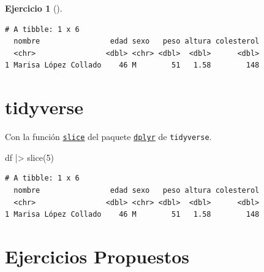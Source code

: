 \documentclass[
  spanish,
  a4paper,
]{scrreport}
\newenvironment{Shaded}{\begin{snugshade}}{\end{snugshade}}
\newcommand{\DecValTok}[1]{\textcolor[rgb]{0.68,0.00,0.00}{#1}}
\newcommand{\FunctionTok}[1]{\textcolor[rgb]{0.28,0.35,0.67}{#1}}
\newcommand{\NormalTok}[1]{\textcolor[rgb]{0.00,0.23,0.31}{#1}}
\newcommand{\SpecialCharTok}[1]{\textcolor[rgb]{0.37,0.37,0.37}{#1}}
\theoremstyle{definition}
\newtheorem{exercise}{Ejercicio}[chapter]
\theoremstyle{remark}
\begin{document}
\begin{exercise}[]
\begin{enumerate}
\begin{tcolorbox}
\begin{verbatim}
# A tibble: 1 x 6
  nombre                edad sexo   peso altura colesterol
  <chr>                <dbl> <chr> <dbl>  <dbl>      <dbl>
1 Marisa López Collado    46 M        51   1.58        148
\end{verbatim}

  \section{tidyverse}

  Con la función
  \href{https://dplyr.tidyverse.org/reference/slice.html}{\texttt{slice}}
  del paquete
  \href{https://dplyr.tidyverse.org/index.html}{\texttt{dplyr}} de
  \texttt{tidyverse}.

\begin{Shaded}
\begin{Highlighting}[]
\NormalTok{df }\SpecialCharTok{|\textgreater{}} \FunctionTok{slice}\NormalTok{(}\DecValTok{5}\NormalTok{)}
\end{Highlighting}
\end{Shaded}

\begin{verbatim}
# A tibble: 1 x 6
  nombre                edad sexo   peso altura colesterol
  <chr>                <dbl> <chr> <dbl>  <dbl>      <dbl>
1 Marisa López Collado    46 M        51   1.58        148
\end{verbatim}

  \end{tcolorbox}
\end{enumerate}

\end{exercise}

\section{Ejercicios Propuestos}\label{ejercicios-propuestos}
\end{document}
